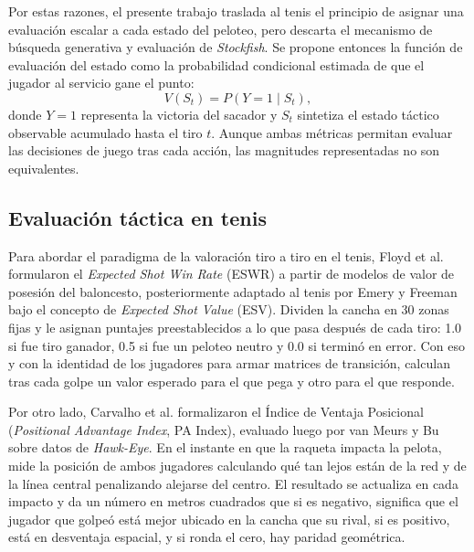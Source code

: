 \documentclass[journal]{IEEEtran}
\begin{document}
Por estas razones, el presente trabajo traslada al tenis el principio de asignar una evaluación escalar a cada estado del peloteo, pero descarta el mecanismo de búsqueda generativa y evaluación de \textit{Stockfish}. Se propone entonces la función de evaluación del estado como la probabilidad condicional estimada de que el jugador al servicio gane el punto:
\begin{equation}
    V(S_t) = P(Y=1 \mid S_t),
    \label{eq:atp_prob}
\end{equation}
donde $Y=1$ representa la victoria del sacador y $S_t$ sintetiza el estado táctico observable acumulado hasta el tiro $t$. Aunque ambas métricas permitan evaluar las decisiones de juego tras cada acción, las magnitudes representadas no son equivalentes.

\subsection{Evaluación táctica en tenis}
Para abordar el paradigma de la valoración tiro a tiro en el tenis, Floyd et al. \cite{floyd2017applying, Floyd2020ShotByShot} formularon el \textit{Expected Shot Win Rate} (ESWR) a partir de modelos de valor de posesión del baloncesto, posteriormente adaptado al tenis por Emery y Freeman \cite{emery2020augmenting} bajo el concepto de \textit{Expected Shot Value} (ESV). Dividen la cancha en 30 zonas fijas y le asignan puntajes preestablecidos a lo que pasa después de cada tiro: 1.0 si fue tiro ganador, 0.5 si fue un peloteo neutro y 0.0 si terminó en error. Con eso y con la identidad de los jugadores para armar matrices de transición, calculan tras cada golpe un valor esperado para el que pega y otro para el que responde. 

Por otro lado, Carvalho et al. \cite{carvalho2013elucidating} formalizaron el Índice de Ventaja Posicional (\textit{Positional Advantage Index}, PA Index), evaluado luego por van Meurs y Bu \cite{vanMeurs2021PositionalAdvantage} sobre datos de \textit{Hawk-Eye}. En el instante en que la raqueta impacta la pelota, mide la posición de ambos jugadores calculando qué tan lejos están de la red y de la línea central penalizando alejarse del centro. El resultado se actualiza en cada impacto y da un número en metros cuadrados que si es negativo, significa que el jugador que golpeó está mejor ubicado en la cancha que su rival, si es positivo, está en desventaja espacial, y si ronda el cero, hay paridad geométrica. 
\end{document}
